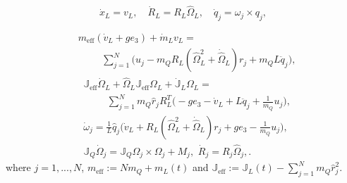 \documentclass[letterpaper, 10 pt, conference]{ieeeconf}  %
\newcommand{\eff}{\text{eff}}
\begin{document}
\begin{equation}
\dot{x}_L = v_L,\quad\dot{R}_L = R_L \hat{\Omega}_L,\quad \dot{q}_j = \omega_j \times q_j, \label{xred}
\end{equation}

\begin{align} %
&m_{\eff} ( \dot{v}_L + ge_3) + \dot{m}_L v_L = \nonumber\\
&\hspace{1cm}\sum_{j=1}^N \Big(u_j - m_Q R_L(\hat{\Omega}_L^2 + \dot{\hat{\Omega}}_L)r_j + m_Q L\ddot{q}_j \Big), \label{vred} %
\end{align}
\begin{align}
&\mathbb{J}_{\eff} \dot{\Omega}_L + \hat{\Omega}_L \mathbb{J}_{\eff} \Omega_L + \dot{\mathbb{J}}_L \Omega_L =\nonumber\\ &\hspace{1cm}\sum_{j=1}^N m_Q \hat{r}_j R_L^T \Big(-g e_3 - \dot{v}_L + L\ddot{q}_j + \frac1{m_Q}u_j\Big),\label{OmegaLred}\\ %
&\dot{\omega}_j = \frac1{L} \hat{q}_j\Big( \dot{v}_L + R_L(\hat{\Omega}_L^2 + \dot{\hat{\Omega}}_L)r_j + ge_3 - \frac1{m_Q} u_j \Big), \label{wjred}\\
&\mathbb{J}_Q \dot{\Omega}_j = \mathbb{J}_Q \Omega_j \times \Omega_j + M_j,\,\, \dot{R}_j = R_j \hat{\Omega}_j,\label{Rdynred}.
\end{align} where $j = 1,...,N$, $m_{\eff} := Nm_Q + m_L(t)$ and $\mathbb{J}_{\eff} := \mathbb{J}_L(t) - \sum_{j=1}^N m_Q \hat{r}_j^2$.


\end{document}
